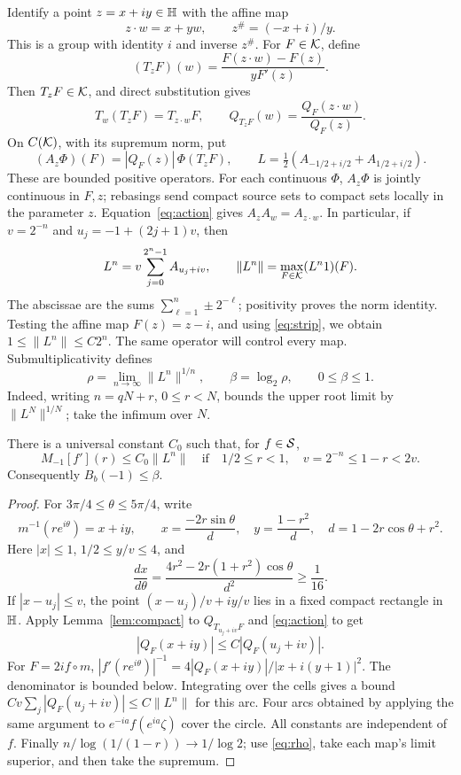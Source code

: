 Identify a point \(z=x+iy\in\mathbb H\) with the affine map
\[
 z\cdot w=x+yw,\qquad z^\#=(-x+i)/y.
\]
This is a group with identity \(i\) and inverse \(z^\#\).
For \(F\in\mathcal K\), define
\[
 (T_zF)(w)=\frac{F(z\cdot w)-F(z)}{yF'(z)}.
\]
Then \(T_zF\in\mathcal K\), and direct substitution gives
\begin{equation}\label{eq:action}
 T_w(T_zF)=T_{z\cdot w}F,\qquad
 Q_{T_zF}(w)=\frac{Q_F(z\cdot w)}{Q_F(z)}.
\end{equation}
On \(C(\mathcal K)\), with its supremum norm, put
\[
 (A_z\Phi)(F)=|Q_F(z)|\,\Phi(T_zF),\qquad
 L=\tfrac12(A_{-1/2+i/2}+A_{1/2+i/2}).
\]
These are bounded positive operators. For each continuous \(\Phi\),
\(A_z\Phi\) is jointly continuous in \(F,z\); rebasings send compact
source sets to compact sets locally in the parameter \(z\).
Equation~\eqref{eq:action} gives \(A_zA_w=A_{z\cdot w}\).
In particular, if
\(v=2^{-n}\) and \(u_j=-1+(2j+1)v\), then
\begin{equation}\label{eq:dyadic}
 L^n=v\sum_{j=0}^{2^n-1}A_{u_j+iv},\qquad
 \|L^n\|=\max_{F\in\mathcal K}(L^n1)(F).
\end{equation}
The abscissae are the sums \(\sum_{\ell=1}^n\pm2^{-\ell}\);
positivity proves the norm identity.
Testing the affine map \(F(z)=z-i\), and using \eqref{eq:strip},
we obtain \(1\le\|L^n\|\le C2^n\).
The same operator will control every map. Submultiplicativity defines
\begin{equation}\label{eq:rho}
 \rho=\lim_{n\to\infty}\|L^n\|^{1/n},
 \qquad \beta=\log_2\rho,\qquad 0\le\beta\le1.
\end{equation}
Indeed, writing \(n=qN+r\), \(0\le r<N\), bounds the upper
root limit by \(\|L^N\|^{1/N}\); take the infimum over \(N\).

\begin{proposition}\label{prop:disk}
There is a universal constant \(C_0\) such that, for \(f\in\mathcal S\),
\[
 M_{-1}[f'](r)\le C_0\|L^n\|
 \quad\text{if}\quad 1/2\le r<1,\quad
 v=2^{-n}\le1-r<2v.
\]
Consequently \(B_b(-1)\le\beta\).
\end{proposition}
\begin{proof}
For \(3\pi/4\le\theta\le5\pi/4\), write
\[
 m^{-1}(re^{i\theta})=x+iy,\qquad
 x=\frac{-2r\sin\theta}{d},\quad
 y=\frac{1-r^2}{d},\quad
 d=1-2r\cos\theta+r^2.
\]
Here \(|x|\le1\), \(1/2\le y/v\le4\), and
\[
 \frac{dx}{d\theta}
 =\frac{4r^2-2r(1+r^2)\cos\theta}{d^2}\ge\frac1{16}.
\]
If \(|x-u_j|\le v\), the point
\((x-u_j)/v+i y/v\) lies in a fixed compact rectangle in \(\mathbb H\).
Apply Lemma~\ref{lem:compact} to \(Q_{T_{u_j+iv}F}\) and
\eqref{eq:action} to get
\[
 |Q_F(x+iy)|\le C|Q_F(u_j+iv)|.
\]
For \(F=2i f\circ m\),
\(|f'(re^{i\theta})|^{-1}=4|Q_F(x+iy)|/|x+i(y+1)|^2\).
The denominator is bounded below. Integrating over the cells gives
a bound \(Cv\sum_j|Q_F(u_j+iv)|\le C\|L^n\|\) for this arc.
Four arcs obtained by applying the same argument to
\(e^{-ia}f(e^{ia}\zeta)\) cover the circle.
All constants are independent of \(f\).
Finally \(n/\log(1/(1-r))\to1/\log2\); use \eqref{eq:rho},
take each map's limit superior, and then take the supremum.
\end{proof}


